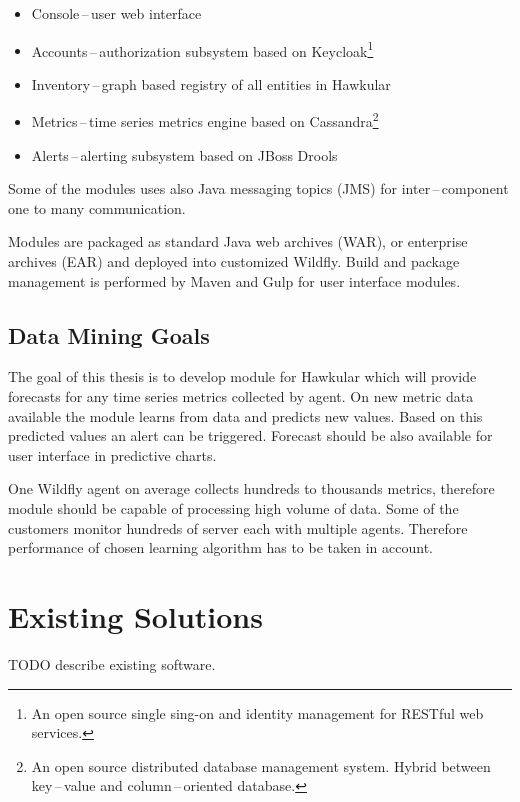     \begin{itemize}
        \item Console\,--\,user web interface
        \item Accounts\,--\,authorization subsystem based on Keycloak\footnote{An open
            source single sing-on and identity management for RESTful web services.}
        \item Inventory\,--\,graph based registry of all entities in Hawkular
        \item Metrics\,--\,time series metrics engine based on Cassandra\footnote{An open
            source distributed database management system. Hybrid between key\,--\,value and
        column\,--\,oriented database.}
        \item Alerts\,--\,alerting subsystem based on JBoss Drools
    \end{itemize}

    Some of the modules uses also Java messaging topics (JMS) for inter\,--\,component
    one to many communication.

    Modules are packaged as standard Java web archives (WAR), or enterprise archives (EAR)
    and deployed into customized Wildfly. Build and package management is performed by 
    Maven and Gulp for user interface modules. 

    \section{Data Mining Goals}
    The goal of this thesis is to develop module for Hawkular which will provide forecasts for any 
    time series metrics collected by agent. On new metric data available the module
    learns from data and predicts new values. Based on this predicted values an alert can
    be triggered. Forecast should be also available for user interface in predictive
    charts. 

    One Wildfly agent on average collects hundreds to thousands metrics, therefore module
    should be capable of processing high volume of data. Some of the customers monitor
    hundreds of server each with multiple agents. Therefore performance of chosen 
    learning algorithm has to be taken in account.

\chapter{Existing Solutions}
TODO describe existing software.


